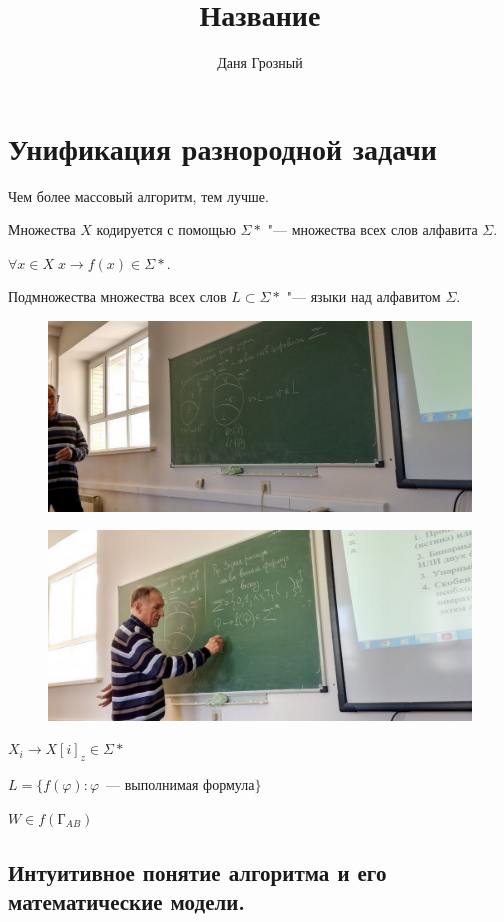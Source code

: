 \documentclass{article}
\title{Название}
\author{Даня Грозный}
\begin{document}
\section{Унификация разнородной задачи}
Чем более массовый алгоритм, тем лучше.

Множества $X$ кодируется с помощью $\Sigma*$ "--- множества всех слов алфавита $\Sigma$. 

$\forall x \in X \; x \to f(x) \in \Sigma*$.

Подмножества множества всех слов $L \subset \Sigma*$ "--- языки над алфавитом $\Sigma$.

\begin{figure}[h!]
    \includegraphics[width=\textwidth]{1.jpg}
\end{figure}

\begin{figure}[h!]
    \includegraphics[width=\textwidth]{2.jpg}
\end{figure}

$X_i \to X[i]_z \in \Sigma*$

$L = \{f(\varphi) : \varphi \, \text{ --- выполнимая формула}\}$

$W \in f(\text{Г}_{AB})$

\subsection{Интуитивное понятие алгоритма и его математические модели.}
\end{document}
